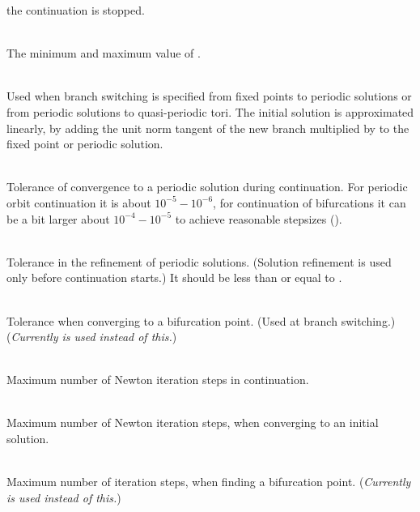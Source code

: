 \documentclass[10pt,a4paper]{ddedoc}
\begin{document}
\begin{description}
the continuation is stopped.
%
\item[\funp{DSMIN}, \funp{DSMAX}] ~\\
The minimum and maximum value of .
%
\item[\funp{DSSTART}] ~\\
Used when branch switching is specified from fixed points to periodic solutions
or from periodic solutions to quasi-periodic tori. The initial solution is
approximated linearly, by adding the unit norm tangent of the new branch
multiplied by  to the fixed point or periodic solution.
%
\item[\funp{EPSC}] ~\\
Tolerance of convergence to a periodic solution during continuation. For
periodic orbit continuation it is about $10^{-5} - 10^{-6}$, for continuation of
bifurcations it can be a bit larger about $10^{-4} - 10^{-5}$ to achieve
reasonable stepsizes ().
%
\item[\funp{EPSR}] ~\\
Tolerance in the refinement of periodic solutions. (Solution refinement is used
only before continuation starts.) It should be less than or equal to
.
%
\item[\funp{EPSS}] ~\\
Tolerance when converging to a bifurcation point. (Used at branch switching.)
(\emph{Currently  is used instead of this.})
%
\item[\funp{NITC}] ~\\
Maximum number of Newton iteration steps in continuation.
%
\item[\funp{NITR}] ~\\
Maximum number of Newton iteration steps, when converging to an initial
solution.
%
\item[\funp{NITS}] ~\\
Maximum number of iteration steps, when finding a bifurcation point.
(\emph{Currently  is used instead of this.})
%
\end{description}
\end{document}
